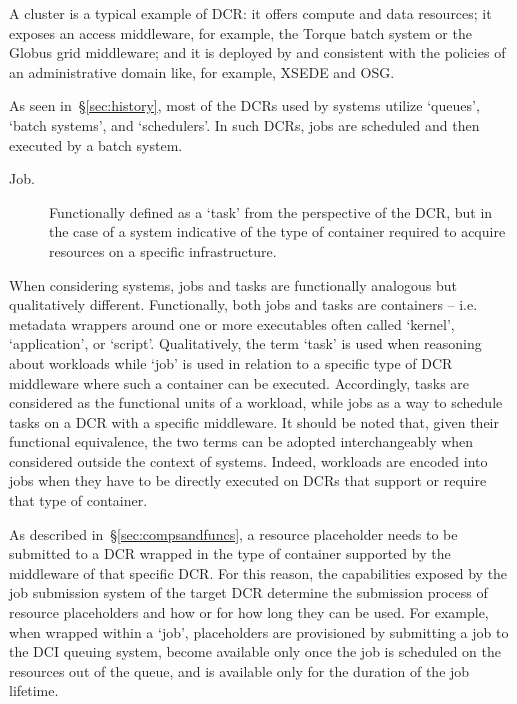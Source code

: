 \documentclass{sig-alternate}
\begin{document}
A cluster is a typical example of DCR: it offers compute and data resources; it
exposes an access middleware, for example, the Torque batch system or the Globus
grid middleware; and it is deployed by and consistent with the policies of an
administrative domain like, for example, XSEDE and OSG.

As seen in~\S\ref{sec:history}, most of the DCRs used by \pilotjob systems
utilize `queues', `batch systems', and `schedulers'. In such DCRs, jobs are
scheduled and then executed by a batch system.

\begin{description}

\item[Job.] Functionally defined as a `task' from the perspective of the DCR,
but in the case of a \pilotjob system indicative of the type of container
required to acquire resources on a specific infrastructure.

\end{description}

When considering \pilotjob systems, jobs and tasks are functionally analogous
but qualitatively different. Functionally, both jobs and tasks are containers --
i.e. metadata wrappers around one or more executables often called `kernel',
`application', or `script'. Qualitatively, the term `task' is used when
reasoning about workloads while `job' is used in relation to a specific type of
DCR middleware where such a container can be executed. Accordingly, tasks are
considered as the functional units of a workload, while jobs as a way to
schedule tasks on a DCR with a specific middleware. It should be noted that,
given their functional equivalence, the two terms can be adopted interchangeably
when considered outside the context of \pilotjob systems. Indeed, workloads are
encoded into jobs when they have to be directly executed on DCRs that support or
require that type of container.

As described in~\S\ref{sec:compsandfuncs}, a resource placeholder needs to be
submitted to a DCR wrapped in the type of container supported by the middleware
of that specific DCR. For this reason, the capabilities exposed by the job
submission system of the target DCR determine the submission process of resource
placeholders and how or for how long they can be used. For example, when wrapped
within a `job', placeholders are provisioned by submitting a job to the DCI
queuing system, become available only once the job is scheduled on the resources
out of the queue, and is available only for the duration of the job lifetime.
\end{document}
